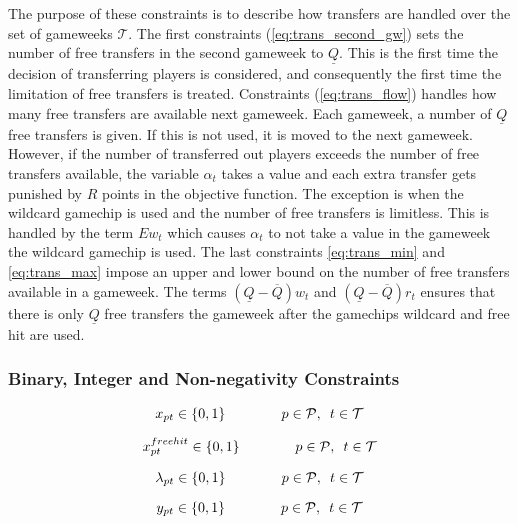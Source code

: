 The purpose of these constraints is to describe how transfers are handled over the set of gameweeks $\mathcal{T}$. The first constraints (\ref{eq:trans_second_gw}) sets the number of free transfers in the second gameweek to $\underline{Q}$. This is the first time the decision of transferring players is considered, and consequently the first time the limitation of free transfers is treated. Constraints (\ref{eq:trans_flow}) handles how many free transfers are available next gameweek. Each gameweek, a number of $\underline{Q}$ free transfers is given. If this is not used, it is moved to the next gameweek. However, if the number of transferred out players exceeds the number of free transfers available, the variable $\alpha_{t}$ takes a value and each extra transfer gets punished by $R$ points in the objective function. The exception is when the wildcard gamechip is used and the number of free transfers is limitless. This is handled by the term $E w_{t}$ which causes $\alpha_{t}$ to not take a value in the gameweek the wildcard gamechip is used. The last constraints \eqref{eq:trans_min} and \eqref{eq:trans_max} impose an upper and lower bound on the number of free transfers available in a gameweek. The terms $(\underline{Q}-\overline{Q})w_{t}$ and $(\underline{Q}-\overline{Q})r_{t}$ ensures that there is only $\underline{Q}$ free transfers the gameweek after the gamechips wildcard and free hit are used. 

 
\subsubsection{Binary, Integer and Non-negativity Constraints}

\begin{equation} \label{eq:bin_x}
    x_{pt} \in \{0,1\} \qquad\qquad p \in \mathcal{P}, \enskip t \in \mathcal{T}
\end{equation}

\begin{equation} \label{eq:free_hit_bin_x}
    x^{free hit}_{pt} \in \{0,1\} \qquad\qquad p \in \mathcal{P}, \enskip t \in \mathcal{T}
\end{equation}

\begin{equation} \label{eq:auxiliary_variable_binary}
    \lambda_{pt} \in \{0,1\} \qquad\qquad p \in \mathcal{P}, \enskip t \in \mathcal{T}
\end{equation}

\begin{equation} \label{eq:bin_y}
    y_{pt} \in \{0,1\} \qquad\qquad p \in \mathcal{P}, \enskip t \in \mathcal{T}
\end{equation}

